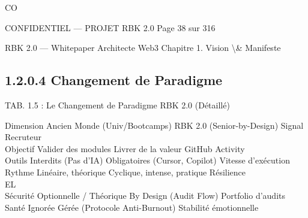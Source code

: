\documentclass[12pt,landscape,a4paper]{article}
\newenvironment{confidential}
{\begin{tcolorbox}[
    colback=rbkred!5!white,
    colframe=rbkred!75!black,
    title=CONFIDENTIEL,
    fonttitle=\bfseries\color{white},
    coltitle=rbkred!75!black,
    breakable,
    enhanced,
    frame hidden,
    borderline west={2pt}{0pt}{rbkred!75!black}
]}
{\end{tcolorbox}}
\begin{document}
CO\\
\vspace{0.5em}
\vspace{0.5em}
\vspace{0.5em}
\vspace{0.5em}
\begin{confidential}CONFIDENTIEL — PROJET RBK 2.0                               Page 38 sur 316\end{confidential}
RBK 2.0 — Whitepaper Architecte Web3                                                                               Chapitre 1. Vision \textbackslash{}& Manifeste\\
\vspace{0.5em}
\vspace{0.5em}
\subsection{1.2.0.4 Changement de Paradigme}
\vspace{0.5em}
\vspace{0.5em}
\begin{center}\begin{tabular}TAB. 1.5 : Le Changement de Paradigme RBK 2.0 (Détaillé)\end{tabular}\end{center}
\vspace{0.5em}
\vspace{0.5em}
Dimension     Ancien Monde (Univ/Bootcamps)      RBK 2.0 (Senior-by-Design)         Signal Recruteur\\
\vspace{0.5em}
Objectif      Valider des modules                Livrer de la valeur                GitHub Activity\\
Outils        Interdits (Pas d’IA)               Obligatoires (Cursor, Copilot)     Vitesse d’exécution\\
Rythme        Linéaire, théorique                Cyclique, intense, pratique        Résilience\\
\vspace{0.5em}
\vspace{0.5em}
\vspace{0.5em}
\vspace{0.5em}
EL\\
Sécurité      Optionnelle / Théorique            By Design (Audit Flow)             Portfolio d’audits\\
Santé         Ignorée                            Gérée (Protocole Anti-Burnout)     Stabilité émotionnelle\\
\end{document}
